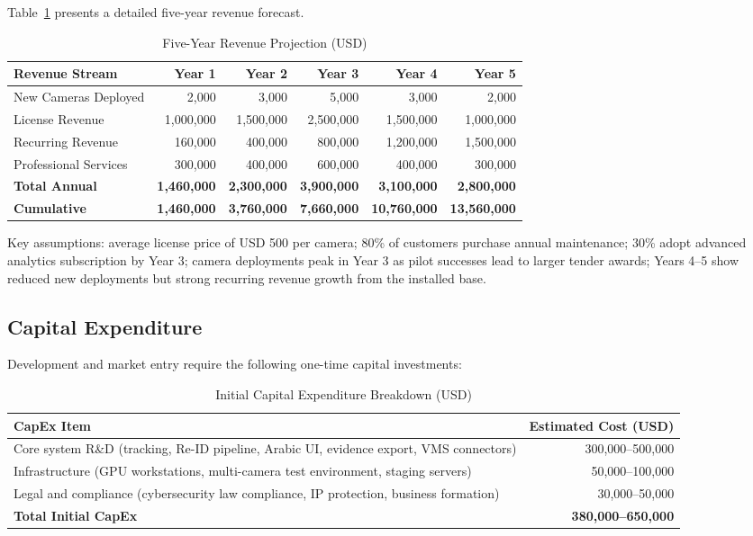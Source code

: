 Table~\ref{tab:revenue-projection} presents a detailed five-year revenue forecast.

\begin{table}[htbp]
\centering
\caption{Five-Year Revenue Projection (USD)}
\label{tab:revenue-projection}
\begin{tabular}{|l|r|r|r|r|r|}
\hline
\textbf{Revenue Stream} & \textbf{Year 1} & \textbf{Year 2} & \textbf{Year 3} & \textbf{Year 4} & \textbf{Year 5} \\
\hline
New Cameras Deployed        & 2,000     & 3,000     & 5,000     & 3,000     & 2,000     \\
License Revenue             & 1,000,000 & 1,500,000 & 2,500,000 & 1,500,000 & 1,000,000 \\
Recurring Revenue           &   160,000 &   400,000 &   800,000 & 1,200,000 & 1,500,000 \\
Professional Services       &   300,000 &   400,000 &   600,000 &   400,000 &   300,000 \\
\hline
\textbf{Total Annual}       & \textbf{1,460,000} & \textbf{2,300,000} & \textbf{3,900,000} & \textbf{3,100,000} & \textbf{2,800,000} \\
\textbf{Cumulative}         & \textbf{1,460,000} & \textbf{3,760,000} & \textbf{7,660,000} & \textbf{10,760,000} & \textbf{13,560,000} \\
\hline
\end{tabular}
\end{table}

Key assumptions: average license price of USD 500 per camera; 80\% of customers purchase annual maintenance; 30\% adopt advanced analytics subscription by Year 3; camera deployments peak in Year 3 as pilot successes lead to larger tender awards; Years 4--5 show reduced new deployments but strong recurring revenue growth from the installed base.

\subsection{Capital Expenditure}

Development and market entry require the following one-time capital investments:

\begin{table}[htbp]
\centering
\caption{Initial Capital Expenditure Breakdown (USD)}
\label{tab:capex}
\begin{tabular}{|l|r|}
\hline
\textbf{CapEx Item} & \textbf{Estimated Cost (USD)} \\
\hline
Core system R\&D (tracking, Re-ID pipeline, Arabic UI, evidence export, VMS connectors) & 300,000--500,000 \\
Infrastructure (GPU workstations, multi-camera test environment, staging servers)       & 50,000--100,000  \\
Legal and compliance (cybersecurity law compliance, IP protection, business formation)  & 30,000--50,000   \\
\hline
\textbf{Total Initial CapEx}                                                            & \textbf{380,000--650,000} \\
\hline
\end{tabular}
\end{table}

